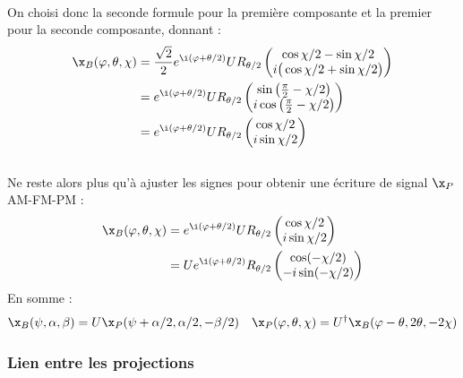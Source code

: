 \\
On choisi donc la seconde formule pour la première composante et la premier pour la seconde composante, donnant :
\begin{align*}
	\x_B(\varphi, \theta, \chi) &= \frac{\sqrt{2}}{2}e^{\i (\varphi + \theta/2)}U R_{\theta/2} \begin{pmatrix} 
		\cos \chi/2 - \sin\chi/2 \\ 
		i\big(\cos\chi/2 + \sin\chi/2\big)
	\end{pmatrix} \\
	&= e^{\i (\varphi + \theta/2)}U R_{\theta/2} \begin{pmatrix} 
		\sin\left( \frac{\pi}{2} - \chi/2\right) \\ 
		i\cos\left( \frac{\pi}{2} - \chi/2\right)
	\end{pmatrix} \\
	&= e^{\i (\varphi + \theta/2)}U R_{\theta/2} \begin{pmatrix} 
		\cos \chi/2 \\ 
		i\sin \chi/2
	\end{pmatrix}
\end{align*}
\\
Ne reste alors plus qu'à ajuster les signes pour obtenir une écriture de signal $\x_P$ AM-FM-PM :
\begin{align*}
	\x_B(\varphi, \theta, \chi) &= e^{\i (\varphi + \theta/2)}U R_{\theta/2} \begin{pmatrix} 
		\cos \chi/2 \\ 
		i\sin \chi/2
	\end{pmatrix} \\
	&= U e^{\i (\varphi + \theta/2)} R_{\theta/2} \begin{pmatrix} 
		\cos (-\chi/2) \\ 
		-i\sin (-\chi/2)
	\end{pmatrix}
\end{align*}
En somme :
\begin{align} \label{eq:bloch2poinca}
	\x_B(\psi, \alpha, \beta) &= U \x_P(\psi + \alpha/2, \alpha/2, -\beta/2)  & 
	\x_P(\varphi, \theta, \chi) = U^\dagger 	\x_B(\varphi-\theta, 2\theta, -2\chi)	
\end{align}
\skipl 



\subsubsection{\todo Lien entre les projections}

